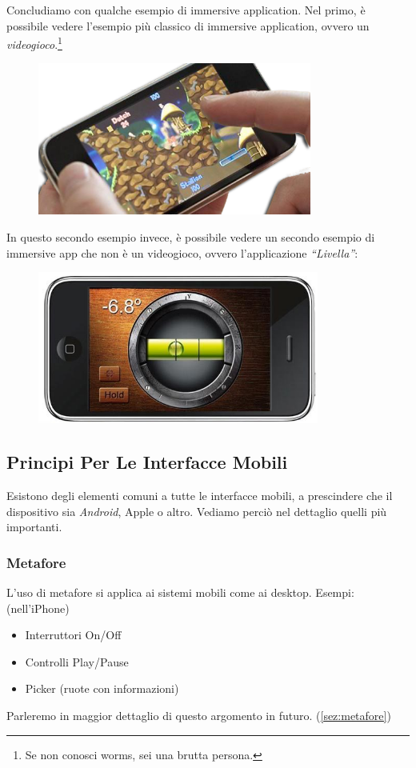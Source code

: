 \documentclass[oneside]{book}
\begin{document}
				Concludiamo con qualche esempio di immersive application. Nel primo, è possibile vedere l'esempio più classico di immersive application, ovvero un \emph{videogioco}.\footnote{Se non conosci worms, sei una brutta persona.}
				\begin{center}
				\begin{figure}[htbp]
				\centering%
				\includegraphics[height = 50mm]{images/worms.png}
				\end{figure}
				\end{center}
				In questo secondo esempio invece, è possibile vedere un secondo esempio di immersive app che non è un videogioco, ovvero l'applicazione \emph{``Livella''}:
				\begin{center}
				\begin{figure}[htbp]
				\centering%
				\includegraphics[height = 50mm]{images/livella.jpg}
				\end{figure}
				\end{center}

		\subsection{Principi Per Le Interfacce Mobili} \label{sec:principiPerLeInterfacceMobili}
			Esistono degli elementi comuni a tutte le interfacce mobili, a prescindere che il dispositivo sia \emph{Android}, Apple o altro. Vediamo perciò nel dettaglio quelli più importanti.

			\subsubsection{Metafore} \label{subsec:metafore}
				L’uso di metafore si applica ai sistemi mobili come ai desktop. Esempi: (nell'iPhone)
				\begin{itemize}
				\item Interruttori On/Off
				\item Controlli Play/Pause
				\item Picker (ruote con informazioni)
				\end{itemize}
				Parleremo in maggior dettaglio di questo argomento in futuro. (\ref{sez:metafore})
\end{document}

